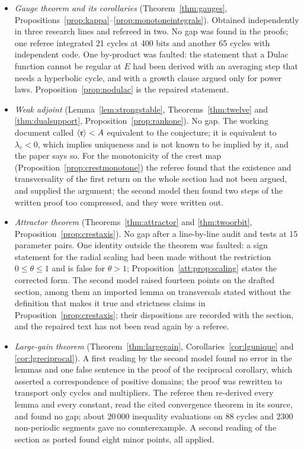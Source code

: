 \begin{itemize}
\item \emph{Gauge theorem and its corollaries} (Theorem~\ref{thm:gauges}, Propositions~\ref{prop:kappa}--\ref{prop:monotoneintegrals}). Obtained independently in three research lines and refereed in two. No gap was found in the proofs; one referee integrated 21 cycles at 400 bits and another 65 cycles with independent code. One by-product was faulted: the statement that a Dulac function cannot be regular at $E$ had been derived with an averaging step that needs a hyperbolic cycle, and with a growth clause argued only for power laws. Proposition~\ref{prop:nodulac} is the repaired statement.
\item \emph{Weak adjoint} (Lemma~\ref{lem:strongstable}, Theorems~\ref{thm:twelve} and \ref{thm:dualsupport}, Proposition~\ref{prop:rankone}). No gap. The working document called $\left\langle \mathfrak r\right\rangle<A$ equivalent to the conjecture; it is equivalent to $\lambda_c<0$, which implies uniqueness and is not known to be implied by it, and the paper says so. For the monotonicity of the crest map (Proposition~\ref{prop:crestmonotone}) the referee found that the existence and transversality of the first return on the whole section had not been argued, and supplied the argument; the second model then found two steps of the written proof too compressed, and they were written out.
\item \emph{Attractor theorem} (Theorems~\ref{thm:attractor} and \ref{thm:twoorbit}, Proposition~\ref{prop:crestaxis}). No gap after a line-by-line audit and tests at 15 parameter pairs. One identity outside the theorem was faulted: a sign statement for the radial scaling had been made without the restriction $0\le\theta\le1$ and is false for $\theta>1$; Proposition~\ref{att:prop:scaling} states the corrected form. The second model raised fourteen points on the drafted section, among them an imported lemma on transversals stated without the definition that makes it true and strictness claims in Proposition~\ref{prop:crestaxis}; their dispositions are recorded with the section, and the repaired text has not been read again by a referee.
\item \emph{Large-gain theorem} (Theorem~\ref{thm:largegain}, Corollaries~\ref{cor:lgunique} and \ref{cor:lgreciprocal}). A first reading by the second model found no error in the lemmas and one false sentence in the proof of the reciprocal corollary, which asserted a correspondence of positive domains; the proof was rewritten to transport only cycles and multipliers. The referee then re-derived every lemma and every constant, read the cited convergence theorem in its source, and found no gap; about $20\,000$ inequality evaluations on 88 cycles and $2300$ non-periodic segments gave no counterexample. A second reading of the section as ported found eight minor points, all applied.

\end{itemize}
